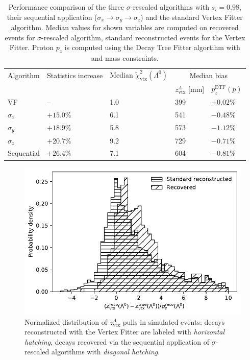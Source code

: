 \begin{table}[t]
	\begin{center}
	\begin{tabular}{@{}lllll@{}}
		\toprule
		Algorithm & Statistics increase & Median $\tilde{\chi}^2_\text{vtx}(\Lambda^0)$ & \multicolumn{2}{c}{Median bias} \\
		\cmidrule{4-5}
		&&& $z_\text{vtx}^\Lambda$ [mm] & $p_z^\text{DTF} (p)$ \\
		\midrule
		VF  	 	& -- 		& 1.0 	& 399 & $+0.02\%$	\\
		\midrule
		$\sigma_x$ 	& $+15.0\%$	& 6.1 	& 541 & $-0.48\%$ 	\\
		$\sigma_y$ 	& $+18.9\%$	& 5.8	& 573 & $-1.12\%$ 	\\
		$\sigma_z$ 	& $+20.7\%$	& 9.2 	& 729 & $-0.71\%$  	\\
		Sequential 	& $+26.4\%$	& 7.1 	& 604 & $-0.81\%$ 	\\
		\bottomrule
	\end{tabular}
	\end{center}
	\caption{Performance comparison of the three $\sigma$-rescaled algorithms with $s_i=0.98$, their sequential application ($\sigma_x \rightarrow \sigma_y \rightarrow \sigma_z$) and the standard Vertex Fitter algorithm.
	Median values for shown variables are computed on recovered events for $\sigma$-rescaled algorithm, standard reconstructed events for the Vertex Fitter.
	Proton $p_z$ is computed using the Decay Tree Fitter algortihm with \jpsi and \lz mass constraints.}
	\label{tab:3:xyz_VF_performances}
\end{table}

\begin{figure}[t]
	\centering
	\includegraphics[width=.6\textwidth]{graphics/03-vertex_reconstruction/Lambda_endvertex_z_bias_pulls_2D_vs_3D.pdf}
	\caption{Normalized distribution of $z_\text{vtx}^\Lambda$ pulls in simulated \demonstratorshort events: decays reconstructed with the Vertex Fitter are labeled with \textit{horizontal hatching}, decays recovered via the sequential application of $\sigma$-rescaled algorithms with \textit{diagonal hatching}.}
	\label{fig:3:xyz_L_ENDVERTEX_residual_2Dv3D_z_rel}
\end{figure}

